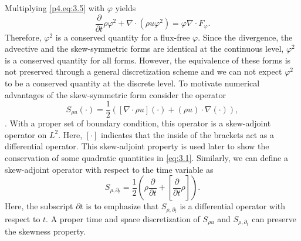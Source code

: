 Multiplying \eqref{p4.eq:3.5} with $\varphi$ yields
\begin{equation}
	\frac{\partial }{\partial t} \rho \varphi^2 + \nabla \cdot ( \rho u \varphi^2  ) = \varphi \nabla \cdot F_{\varphi}.
\end{equation}
Therefore, $\varphi^2$ is a conserved quantity for a flux-free $\varphi$. Since the divergence, the advective and the skew-symmetric forms are identical at the continuous level, $\varphi^2$ is a conserved quantity for all forms. However, the equivalence of these forms is not preserved through a general discretization scheme and we can not expect $\varphi^2$ to be a conserved quantity at the discrete level. To motivate numerical advantages of the skew-symmetric form consider the operator 
\begin{equation}
	S_{\rho u}(\cdot) = \frac 1 2 ( [ \nabla \cdot \rho u ](\cdot) + (\rho u)\cdot \nabla(\cdot) ),
\end{equation}
. With a proper set of boundary condition, this operator is a skew-adjoint operator on $L^2$. Here, $[\cdot]$ indicates that the inside of the brackets act as a differential operator. This skew-adjoint property is used later to show the conservation of some quadratic quantities in \eqref{eq:3.1}. Similarly, we can define a skew-adjoint operator with respect to the time variable as
\begin{equation}
	S_{\rho,\partial_t} = \frac{1}{2} \left( \rho \frac{\partial}{\partial t} + [ \frac{\partial}{\partial t} \rho] \right).
\end{equation}
Here, the subscript $\partial t$ is to emphasize that $S_{\rho,\partial_t}$ is a differential operator with respect to $t$. A proper time and space discretization of $S_{\rho u}$ and $S_{\rho,\partial_t}$ can preserve the skewness property.

